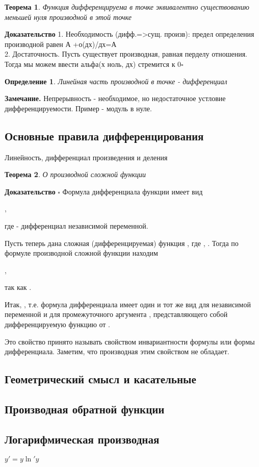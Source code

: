 \documentclass[a4paper]{article}
\newtheorem{defin}{Определение}
\newtheorem{theor}{Теорема}
\begin{document}
\begin{theor}
Функция дифференцируема в точке эквивалентно существованию меньшей нуля
производной в этой точке
\end{theor}
\textbf{Доказательство} 1. Необходимость (дифф.=>сущ. произв): предел 
определения производной равен А +о(дх)/дх=А\\
2. Достаточность. Пусть существует производная, равная перделу отношения. 
Тогда мы можем ввести альфа(х ноль, дх) стремится к 0$\square$
\begin{defin}
Линейная часть производной в точке - дифференциал
\end{defin}
\textbf{Замечание.} Непрерывность - необходимое, но недостаточное устловие 
дифференцируемости. Пример - модуль в нуле.
\subsection{Основные правила дифференцирования}
Линейность, дифференциал произведения и деления
\begin{theor}
О производной сложной функции
\end{theor}
\textbf{Доказательство} $\square$
Формула дифференциала функции имеет вид

,

где  - дифференциал  независимой переменной.

Пусть теперь дана сложная (дифференцируемая) функция , где , . Тогда по формуле 
производной сложной функции находим

,

так как .

Итак, , т.е. формула дифференциала имеет один и тот же вид для независимой
переменной  и для промежуточного аргумента , представляющего собой 
дифференцируемую функцию от .

Это свойство принято называть свойством инвариантности формулы или формы 
дифференциала. Заметим, что производная этим свойством не обладает.
\subsection{Геометрический смысл и касательные}
\subsection{Производная обратной функции}
\subsection{Логарифмическая производная}
$y'=y\ln' y$
\end{document}
